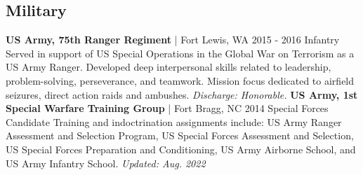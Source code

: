 \documentclass{article}
\begin{document}
\begin{bgbox}[
        height = \paperheight,
        width = 0.69\textwidth,
        colback = white
    ]
{            \section*{Military}
                \textbf{US Army, 75th Ranger Regiment} | Fort Lewis, WA \hfill{2015 - 2016}\newline
                        Infantry\newline\newline
                            Served in support of US Special Operations in the Global War on Terrorism as a US Army Ranger. Developed deep interpersonal skills related to leadership, problem-solving, perseverance, and teamwork. Mission focus dedicated to airfield seizures, direct action raids and ambushes. \textit{Discharge: Honorable.}\newline\newline
                \textbf{US Army, 1st Special Warfare Training Group} | Fort Bragg, NC \hfill{2014}\newline
                        Special Forces Candidate\newline\newline
                            Training and indoctrination assignments include: US Army Ranger Assessment and Selection Program, US Special Forces Assessment and Selection, US Special Forces Preparation and Conditioning, US Army Airborne School, and US Army Infantry School.\newline
            \mbox{}
            \vfill
            \hfill{}\textit{Updated: Aug. 2022}
    }
    \end{bgbox}
\end{document}
